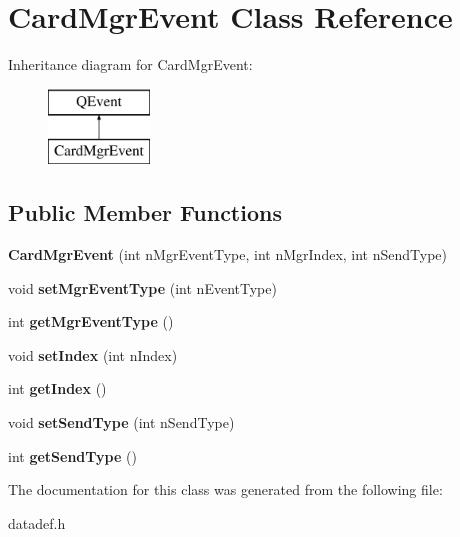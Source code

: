 \hypertarget{class_card_mgr_event}{\section{Card\-Mgr\-Event Class Reference}
\label{class_card_mgr_event}
}
Inheritance diagram for Card\-Mgr\-Event\-:\begin{figure}[H]
\begin{center}
\leavevmode
\includegraphics[height=2.000000cm]{class_card_mgr_event}
\end{center}
\end{figure}
\subsection*{Public Member Functions}
\begin{DoxyCompactItemize}
\item 
\hypertarget{class_card_mgr_event_a61f2c2b5dbf5ff55afee002640eae217}{{\bfseries Card\-Mgr\-Event} (int n\-Mgr\-Event\-Type, int n\-Mgr\-Index, int n\-Send\-Type)}\label{class_card_mgr_event_a61f2c2b5dbf5ff55afee002640eae217}

\item 
\hypertarget{class_card_mgr_event_ac73489a391b31364d08181678f687247}{void {\bfseries set\-Mgr\-Event\-Type} (int n\-Event\-Type)}\label{class_card_mgr_event_ac73489a391b31364d08181678f687247}

\item 
\hypertarget{class_card_mgr_event_aa9c78af4b24f65dfb8ca61d59910005d}{int {\bfseries get\-Mgr\-Event\-Type} ()}\label{class_card_mgr_event_aa9c78af4b24f65dfb8ca61d59910005d}

\item 
\hypertarget{class_card_mgr_event_a5004efc27b8e1b40ee6f2715883353de}{void {\bfseries set\-Index} (int n\-Index)}\label{class_card_mgr_event_a5004efc27b8e1b40ee6f2715883353de}

\item 
\hypertarget{class_card_mgr_event_a8c36836791067f65f0ed3cf59072e17c}{int {\bfseries get\-Index} ()}\label{class_card_mgr_event_a8c36836791067f65f0ed3cf59072e17c}

\item 
\hypertarget{class_card_mgr_event_abf5aa7141de426f39d165e84b645f697}{void {\bfseries set\-Send\-Type} (int n\-Send\-Type)}\label{class_card_mgr_event_abf5aa7141de426f39d165e84b645f697}

\item 
\hypertarget{class_card_mgr_event_a43123c65e5047257ccca663f696526e7}{int {\bfseries get\-Send\-Type} ()}\label{class_card_mgr_event_a43123c65e5047257ccca663f696526e7}

\end{DoxyCompactItemize}


The documentation for this class was generated from the following file\-:\begin{DoxyCompactItemize}
\item 
datadef.\-h\end{DoxyCompactItemize}
